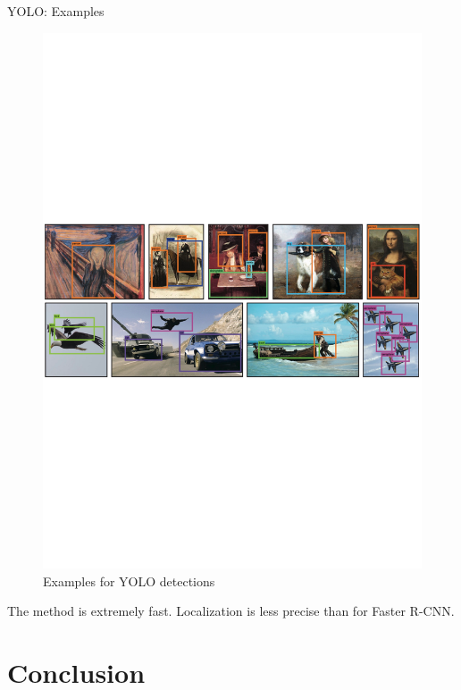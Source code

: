 \documentclass[xcolor=pdftex,dvipsnames,table]{beamer}
\begin{document}
\begin{frame}{YOLO: Examples}
\begin{figure}[htb]
   \centering
   \includegraphics[width=\textwidth]{../graphics/YOLO_ex.pdf}
   \caption{Examples for YOLO detections}
\end{figure}
The method is extremely fast. Localization is less precise than for Faster R-CNN. 
\end{frame}




\section{Conclusion}
\end{document}

